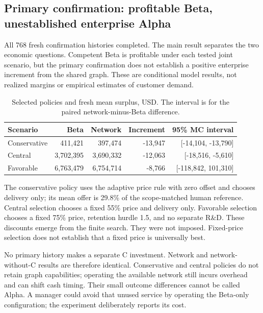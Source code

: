 \subsection{Primary confirmation: profitable Beta, unestablished enterprise Alpha}

All 768 fresh confirmation histories completed. The main result separates the two economic questions. Competent Beta is profitable under each tested joint scenario, but the primary confirmation does not establish a positive enterprise increment from the shared graph. These are conditional model results, not realized margins or empirical estimates of customer demand.

\begin{table}[H]\centering\small\caption{Selected policies and fresh mean surplus, USD. The interval is for the paired network-minus-Beta difference.}\label{tab:primary}

\begin{tabular}{lrrrr}\toprule Scenario & Beta & Network & Increment & 95\% MC interval\\\midrule

Conservative & 411,421 & 397,474 & -13,947 & [-14,104, -13,790] \\

Central & 3,702,395 & 3,690,332 & -12,063 & [-18,516, -5,610] \\

Favorable & 6,763,479 & 6,754,714 & -8,766 & [-118,842, 101,310] \\

\bottomrule\end{tabular}\end{table}

The conservative policy uses the adaptive price rule with zero offset and chooses delivery only; its mean offer is 29.8\% of the scope-matched human reference. Central selection chooses a fixed 55\% price and delivery only. Favorable selection chooses a fixed 75\% price, retention hurdle 1.5, and no separate R\&D. These discounts emerge from the finite search. They were not imposed. Fixed-price selection does not establish that a fixed price is universally best.

No primary history makes a separate C investment. Network and network-without-C results are therefore identical. Conservative and central policies do not retain graph capabilities; operating the available network still incurs overhead and can shift cash timing. Their small outcome differences cannot be called Alpha. A manager could avoid that unused service by operating the Beta-only configuration; the experiment deliberately reports its cost.

